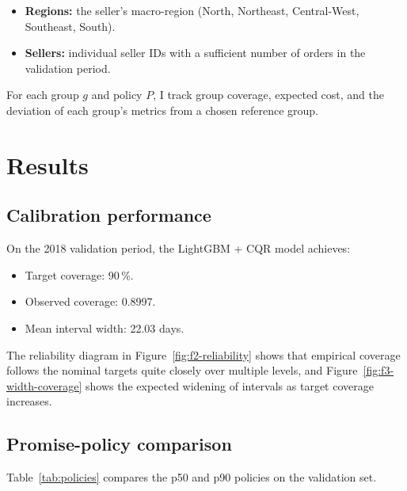 \documentclass[12pt]{article}
\begin{document}
\begin{itemize}
  \item \textbf{Regions:} the seller’s macro-region (North, Northeast, Central-West, Southeast, South).
  \item \textbf{Sellers:} individual seller IDs with a sufficient number of orders in the validation period.
\end{itemize}

For each group $g$ and policy $P$, I track group coverage, expected cost, and the deviation of each group’s metrics from a chosen reference group.

\section{Results}
\subsection{Calibration performance}
On the 2018 validation period, the LightGBM + CQR model achieves:
\begin{itemize}
  \item Target coverage: 90\,\%.
  \item Observed coverage: 0.8997.
  \item Mean interval width: 22.03 days.
\end{itemize}

The reliability diagram in Figure~\ref{fig:f2-reliability} shows that empirical coverage follows the nominal targets quite closely over multiple levels, and Figure~\ref{fig:f3-width-coverage} shows the expected widening of intervals as target coverage increases.

\subsection{Promise-policy comparison}
Table~\ref{tab:policies} compares the p50 and p90 policies on the validation set.

\begin{table}[t]
  \centering
  \caption{Policy metrics for two quantile-based promise policies on the Olist validation set. The cost uses $\lambda_{\text{late}}=5$ and $\lambda_{\text{early}}=1$.}
  \label{tab:policies}
  \setlength{\tabcolsep}{4pt}
  \renewcommand{\arraystretch}{1.1}
\end{table}
\end{document}
